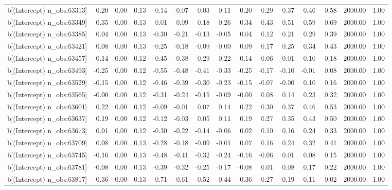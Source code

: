 \begin{table}[ht]
\begin{tabular}{rrrrrrrrrrrrrrr}
  b[(Intercept) n\_obs:63313] & 0.20 & 0.00 & 0.13 & -0.14 & -0.07 & 0.03 & 0.11 & 0.20 & 0.29 & 0.37 & 0.46 & 0.58 & 2000.00 & 1.00 \\ 
  b[(Intercept) n\_obs:63349] & 0.35 & 0.00 & 0.13 & 0.01 & 0.09 & 0.18 & 0.26 & 0.34 & 0.43 & 0.51 & 0.59 & 0.69 & 2000.00 & 1.00 \\ 
  b[(Intercept) n\_obs:63385] & 0.04 & 0.00 & 0.13 & -0.30 & -0.21 & -0.13 & -0.05 & 0.04 & 0.12 & 0.21 & 0.29 & 0.39 & 2000.00 & 1.00 \\ 
  b[(Intercept) n\_obs:63421] & 0.08 & 0.00 & 0.13 & -0.25 & -0.18 & -0.09 & -0.00 & 0.09 & 0.17 & 0.25 & 0.34 & 0.43 & 2000.00 & 1.00 \\ 
  b[(Intercept) n\_obs:63457] & -0.14 & 0.00 & 0.12 & -0.45 & -0.38 & -0.29 & -0.22 & -0.14 & -0.06 & 0.01 & 0.10 & 0.18 & 2000.00 & 1.00 \\ 
  b[(Intercept) n\_obs:63493] & -0.25 & 0.00 & 0.12 & -0.55 & -0.48 & -0.41 & -0.33 & -0.25 & -0.17 & -0.10 & -0.01 & 0.08 & 2000.00 & 1.00 \\ 
  b[(Intercept) n\_obs:63529] & -0.15 & 0.00 & 0.12 & -0.46 & -0.39 & -0.30 & -0.23 & -0.15 & -0.07 & -0.00 & 0.10 & 0.16 & 2000.00 & 1.00 \\ 
  b[(Intercept) n\_obs:63565] & -0.00 & 0.00 & 0.12 & -0.31 & -0.24 & -0.15 & -0.09 & -0.00 & 0.08 & 0.14 & 0.23 & 0.32 & 2000.00 & 1.00 \\ 
  b[(Intercept) n\_obs:63601] & 0.22 & 0.00 & 0.12 & -0.09 & -0.01 & 0.07 & 0.14 & 0.22 & 0.30 & 0.37 & 0.46 & 0.53 & 2000.00 & 1.00 \\ 
  b[(Intercept) n\_obs:63637] & 0.19 & 0.00 & 0.12 & -0.12 & -0.03 & 0.05 & 0.11 & 0.19 & 0.27 & 0.35 & 0.43 & 0.50 & 2000.00 & 1.00 \\ 
  b[(Intercept) n\_obs:63673] & 0.01 & 0.00 & 0.12 & -0.30 & -0.22 & -0.14 & -0.06 & 0.02 & 0.10 & 0.16 & 0.24 & 0.33 & 2000.00 & 1.00 \\ 
  b[(Intercept) n\_obs:63709] & 0.08 & 0.00 & 0.13 & -0.28 & -0.18 & -0.09 & -0.01 & 0.07 & 0.16 & 0.24 & 0.32 & 0.41 & 2000.00 & 1.00 \\ 
  b[(Intercept) n\_obs:63745] & -0.16 & 0.00 & 0.13 & -0.48 & -0.41 & -0.32 & -0.24 & -0.16 & -0.06 & 0.01 & 0.08 & 0.15 & 2000.00 & 1.00 \\ 
  b[(Intercept) n\_obs:63781] & -0.08 & 0.00 & 0.13 & -0.39 & -0.32 & -0.25 & -0.17 & -0.08 & 0.01 & 0.08 & 0.17 & 0.22 & 2000.00 & 1.00 \\ 
  b[(Intercept) n\_obs:63817] & -0.36 & 0.00 & 0.13 & -0.71 & -0.61 & -0.52 & -0.44 & -0.36 & -0.27 & -0.19 & -0.11 & -0.02 & 2000.00 & 1.00 \\ 

\end{tabular}
\end{table}
